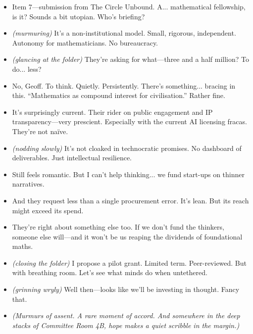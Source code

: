 \begin{itemize}[leftmargin=3.5cm]

\item[Chair (Baroness Kingsley):] Item 7—submission from The Circle Unbound. A... mathematical fellowship, is it? Sounds a bit utopian. Who’s briefing?

\item[Aide:] \textit{(murmuring)} It's a non-institutional model. Small, rigorous, independent. Autonomy for mathematicians. No bureaucracy.

\item[Geoffrey Molesworth MP:] \textit{(glancing at the folder)} They’re asking for what—three and a half million? To do... less?


\item[Lord Finley of Merioneth:] No, Geoff. To think. Quietly. Persistently. There’s something... bracing in this. “Mathematics as compound interest for civilisation.” Rather fine.

\item[Dr Bhatt (STEM Advisor):] It’s surprisingly current. Their rider on public engagement and IP transparency—very prescient. Especially with the current AI licensing fracas. They're not naïve.

\item[Baroness Kingsley:] \textit{(nodding slowly)} It's not cloaked in technocratic promises. No dashboard of deliverables. Just intellectual resilience.

\item[Molesworth:] Still feels romantic. But I can’t help thinking... we fund start-ups on thinner narratives.

\item[Lord Finley:] And they request less than a single procurement error. It's lean. But its reach might exceed its spend.

\item[Saira Bhatt:] They’re right about something else too. If we don’t fund the thinkers, someone else will—and it won’t be us reaping the dividends of foundational maths.

\item[Kingsley:] \textit{(closing the folder)} I propose a pilot grant. Limited term. Peer-reviewed. But with breathing room. Let’s see what minds do when untethered.

\item[Molesworth:] \textit{(grinning wryly)} Well then—looks like we’ll be investing in thought. Fancy that.

\item[] \textit{(Murmurs of assent. A rare moment of accord. And somewhere in the deep stacks of Committee Room 4B, hope makes a quiet scribble in the margin.)}

\end{itemize}


